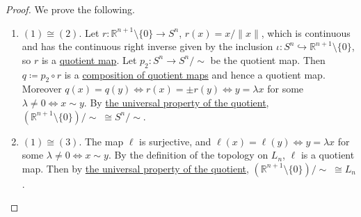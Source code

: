 	\begin{proof}
	  We prove the following. 
		\begin{enumerate}
		  \item $(1) \cong (2)$. Let $r: \mathbb{R}^{n+1} \setminus \{0\} \rightarrow S^n$, $r(x) = x / \|x\|$, which is continuous and has the continuous right inverse given by the inclusion $\iota: S^n \hookrightarrow \mathbb{R}^{n+1} \setminus \{0\}$, so $r$ is a \hyperref[def:quotient-map]{quotient map}. Let $p_2: S^n \rightarrow S^n / {\sim}$ be the quotient map. Then $q \coloneqq p_2 \circ r$ is a \hyperref[thm:composition-of-quotient-maps]{composition of quotient maps} and hence a quotient map. Moreover $q(x) = q(y) \iff r(x) = \pm r(y) \iff y = \lambda x$ for some $\lambda \neq 0 \iff x \sim y$. By \hyperref[thm:quotient_homeomorphism]{the universal property of the quotient}, $(\mathbb{R}^{n+1} \setminus \{0\})/{\sim} \; \cong S^n/{\sim}$. 

			\item $(1) \cong (3)$. The map $\ell$ is surjective, and $\ell(x) = \ell(y) \iff y = \lambda x$ for some $\lambda \neq 0 \iff x \sim y$. By the definition of the topology on $L_n$, $\ell$ is a quotient map. Then by \hyperref[thm:quotient_homeomorphism]{the universal property of the quotient}, $(\mathbb{R}^{n+1} \setminus \{0\})/{\sim} \; \cong L_n$. 
		\end{enumerate}
	\end{proof}

